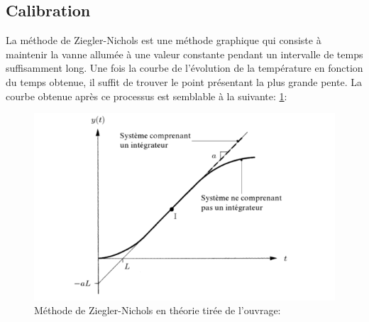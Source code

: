 \documentclass[12pt]{report}
\begin{document}
\subsection{Calibration}
La méthode de Ziegler-Nichols est une méthode graphique qui consiste à maintenir la vanne allumée à une valeur constante pendant un intervalle de temps suffisamment long. Une fois la courbe de l'évolution de la température en fonction du temps obtenue, il suffit de trouver le point présentant la plus grande pente. La courbe obtenue après ce processus est semblable à la suivante: \ref{graphe2}:\\

\begin{figure}[H]
\begin{center}
\includegraphics[scale = 0.95]{zn.PNG}
\caption{\label{graphe2} Méthode de Ziegler-Nichols en théorie tirée de l'ouvrage: \cite{_commande_????}}
\end{center}
\end{figure}
\end{document}
